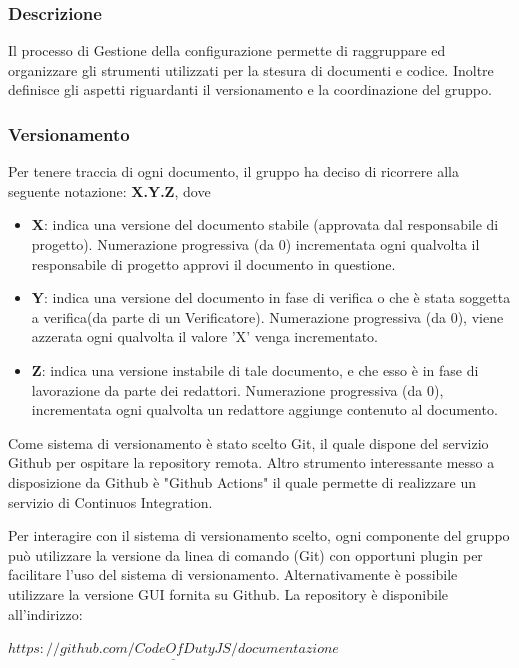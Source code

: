 		\subsubsection{Descrizione}
		Il processo di Gestione della configurazione permette di raggruppare ed organizzare gli strumenti utilizzati per la stesura di documenti e codice. Inoltre definisce gli aspetti riguardanti il versionamento e la coordinazione del gruppo.
		
		\subsubsection{Versionamento}
			
			Per tenere traccia di ogni documento, il gruppo ha deciso di ricorrere alla seguente notazione: \textbf{X.Y.Z}, dove
			\begin{itemize}
				
				\item \textbf{X}: indica una versione del documento stabile (approvata dal responsabile di progetto). Numerazione progressiva (da 0) incrementata ogni qualvolta il responsabile di progetto approvi il documento in questione.
				
				\item \textbf{Y}: indica una versione del documento in fase di verifica o che è stata soggetta a verifica(da parte di un Verificatore). Numerazione progressiva (da 0), viene azzerata ogni qualvolta il valore 'X' venga incrementato.
				
				\item \textbf{Z}: indica una versione instabile di tale documento, e che esso è in fase di lavorazione da parte dei redattori. Numerazione progressiva (da 0), incrementata ogni qualvolta un redattore aggiunge contenuto al documento.
			\end{itemize}
			
			Come sistema di versionamento è stato scelto Git, il quale dispone del servizio Github per ospitare la repository remota. Altro strumento interessante messo a disposizione da Github è "Github Actions" il quale permette di realizzare un servizio di Continuos Integration.
			
			Per interagire con il sistema di versionamento scelto, ogni componente del gruppo può utilizzare la versione da linea di comando (Git) con opportuni plugin per facilitare l'uso del sistema di versionamento. Alternativamente è possibile utilizzare la versione GUI fornita su Github. La repository è disponibile all'indirizzo:\\
			\begin{center}
				$\underline{https://github.com/CodeOfDutyJS/documentazione}$
			\end{center}
			
